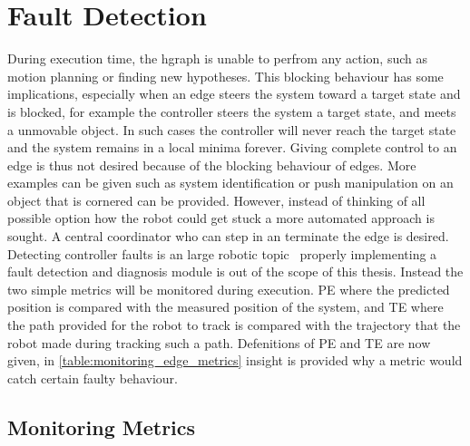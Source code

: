 \section{Fault Detection}%
\label{sec:fault_detection}
During execution time, the \ac{hgraph} is unable to perfrom any action, such as motion planning or finding new hypotheses. This blocking behaviour has some implications, especially when an edge steers the system toward a target state and is blocked, for example the controller steers the system a target state, and meets a unmovable object. In such cases the controller will never reach the target state and the system remains in a local minima forever. Giving complete control to an edge is thus not desired because of the blocking behaviour of edges. More examples can be given such as system identification or push manipulation on an object that is cornered can be provided. However, instead of thinking of all possible option how the robot could get stuck a more automated approach is sought.  A central coordinator who can step in an terminate the edge is desired. Detecting controller faults is an large robotic topic~\cite{khalastchi_fault_2019} properly implementing a fault detection and diagnosis module is out of the scope of this thesis. Instead the two simple metrics will be monitored during execution. \ac{PE} where the predicted position is compared with the measured position of the system, and \ac{TE} where the path provided for the robot to track is compared with the trajectory that the robot made during tracking such a path. Defenitions of \ac{PE} and \ac{TE} are now given, in \cref{table:monitoring_edge_metrics} insight is provided why a metric would catch certain faulty behaviour.


\subsection{Monitoring Metrics}

